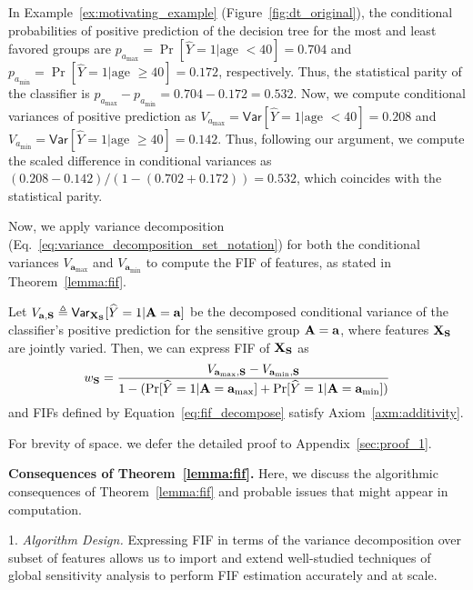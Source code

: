 \begin{example}
	In Example~\ref{ex:motivating_example} (Figure~\ref{fig:dt_original}), the conditional probabilities of positive prediction of the decision tree for the most and least favored groups are $  p_{a_{\max}} = \Pr[\widehat{Y} = 1 | \text{age } < 40] = 0.704 $ and $ p_{a_{\min}} = \Pr[\widehat{Y} = 1 | \text{age } \ge 40] = 0.172 $, respectively. Thus, the statistical parity of the classifier is $ p_{a_{\max}} - p_{a_{\min}} = 0.704 - 0.172 =  0.532 $. Now, we compute conditional variances of positive prediction as $ V_{a_{\max}} = \mathsf{Var}[\widehat{Y} = 1| \text{age } < 40] = 0.208 $ and $ V_{a_{\min}} = \mathsf{Var}[\widehat{Y} = 1| \text{age } \ge 40] = 0.142 $. Thus, following our argument, we compute the scaled difference in conditional variances as $ (0.208 - 0.142)/(1 - (0.702 + 0.172)) = 0.532 $, which coincides with the statistical parity.
\end{example}
Now, we apply variance decomposition (Eq.~\eqref{eq:variance_decomposition_set_notation}) for both the conditional variances $ V_{\mathbf{a}_{\max}} $ and $ V_{\mathbf{a}_{\min}} $ to compute the FIF of features, as stated in Theorem~\ref{lemma:fif}.
\begin{theorem}
	\label{lemma:fif}
	Let $ V_{\mathbf{a}, \mathbf{S}} \triangleq \mathsf{Var}_{\mathbf{X}_{\mathbf{S}}}[\widehat{Y} = 1|\mathbf{A} = \mathbf{a}] $ be the decomposed conditional variance of the classifier's positive prediction for the sensitive group $ \mathbf{A} = \mathbf{a} $, where features $ \mathbf{X}_{\mathbf{S}} $ are jointly varied. Then, we can express FIF of $ \mathbf{X}_{\mathbf{S}} $ as
	\begin{equation}\label{eq:fif_decompose}
	w_{\mathbf{S}}  = \frac{V_{\mathbf{a}_{\max},\mathbf{S}} - V_{\mathbf{a}_{\min},\mathbf{S}}}{1 - (\Pr[\widehat{Y} = 1 |  \mathbf{A} = \mathbf{a}_{\max}] + \Pr[\widehat{Y} = 1 |  \mathbf{A} = \mathbf{a}_{\min}])}
	\end{equation}
	and FIFs defined by Equation~\eqref{eq:fif_decompose} satisfy Axiom~\ref{axm:additivity}.
\end{theorem}
For brevity of space. we defer the detailed proof to Appendix~\ref{sec:proof_1}.

\noindent\textbf{Consequences of Theorem~\ref{lemma:fif}.} Here, we discuss the algorithmic consequences of Theorem~\ref{lemma:fif} and probable issues that might appear in computation.

1. \textit{Algorithm Design.} Expressing FIF in terms of the variance decomposition over subset of features allows us to import and extend well-studied techniques of global sensitivity analysis to perform FIF estimation accurately and at scale.


